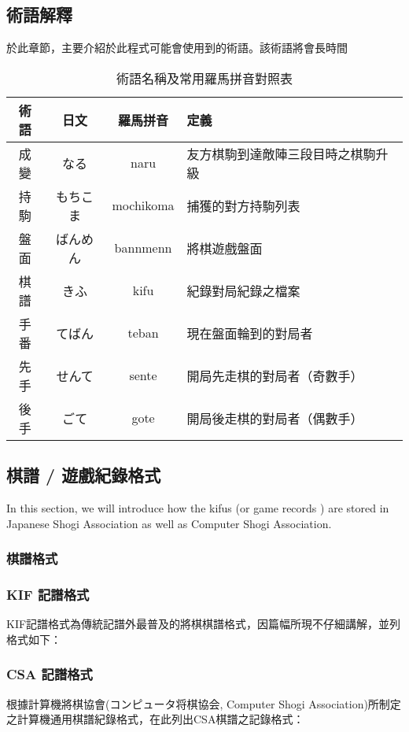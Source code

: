 	\subsection{術語解釋}
	於此章節，主要介紹於此程式可能會使用到的術語。該術語將會長時間
	\begin{table}[]
	    \centering
	    	\begin{tabular}{c|c|c|l}
	        術語 & 日文 & 羅馬拼音 & 定義\\
	        \hline
	        成變 & なる  & naru  & 友方棋駒到達敵陣三段目時之棋駒升級\\
	        持駒& もちこま & mochikoma& 捕獲的對方持駒列表\\
	        盤面& ばんめん & bannmenn&將棋遊戲盤面\\
	        棋譜 & きふ & kifu& 紀錄對局紀錄之檔案\\
	        手番 & てばん & teban & 現在盤面輪到的對局者\\
	        先手 & せんて & sente&     開局先走棋的對局者（奇數手）\\
	        後手 & ごて & gote& 開局後走棋的對局者（偶數手）\\
	       
	    \end{tabular}
	    \caption{術語名稱及常用羅馬拼音對照表}
	    \label{tab:my_label}
	\end{table}

	

	\subsection{棋譜 / 遊戲紀錄格式}
	In this section, we will introduce how the kifus (or game records ) are stored in Japanese Shogi Association as well as Computer Shogi Association.
	
	\subsubsection{棋譜格式}


    \lstset{escapeinside=``}
    \subsubsection{KIF 記譜格式}
    KIF記譜格式為傳統記譜外最普及的將棋棋譜格式，因篇幅所現不仔細講解，並列格式如下：
    
	\subsubsection{CSA 記譜格式}
	根據計算機將棋協會(コンピュータ将棋協会, Computer Shogi Association)所制定之計算機通用棋譜紀錄格式\cite{CSA}，在此列出CSA棋譜之記錄格式：
	
